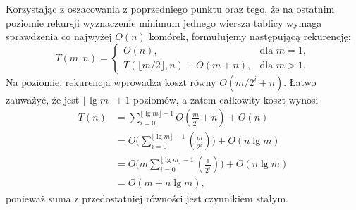 \subexercise{} %
Korzystając z oszacowania z poprzedniego punktu oraz tego, że na ostatnim poziomie rekursji wyznaczenie minimum jednego wiersza tablicy wymaga sprawdzenia co najwyżej $O(n)$ komórek, formułujemy następującą rekurencję:
\[
	T(m,n) =
	\begin{cases}
		O(n), & \text{dla $m=1$}, \\
		T(\lfloor m/2\rfloor,n)+O(m+n), & \text{dla $m>1$}.
	\end{cases}
\]
Na  poziomie, rekurencja wprowadza koszt równy $O(m/2^i+n)$. Łatwo zauważyć, że jest $\lfloor\lg m\rfloor+1$ poziomów, a zatem całkowity koszt wynosi
\begin{align*}
	T(n) &= \sum_{i=0}^{\lfloor\lg m\rfloor-1}O\left(\frac{m}{2^i}+n\right)+O(n) \\
	&= O\biggl(\sum_{i=0}^{\lfloor\lg m\rfloor-1}\left(\frac{m}{2^i}\right)\biggr)+O(n\lg m) \\
	&= O\biggl(m\sum_{i=0}^{\lfloor\lg m\rfloor-1}\left(\frac{1}{2^i}\right)\biggr)+O(n\lg m) \\
	&= O(m+n\lg m),
\end{align*}
ponieważ suma z przedostatniej równości jest czynnikiem stałym.

\endinput
